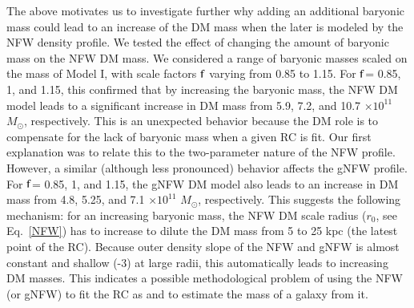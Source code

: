 \documentclass{aa}
\begin{document}
The above motivates us to investigate further why adding an additional baryonic mass could lead to an increase of the DM mass when the later is modeled by the NFW density profile. We tested the effect of changing the amount of baryonic mass on the NFW DM mass. We considered a range of baryonic masses scaled on the mass of Model I, with scale factors $\rm f$ varying from 0.85 to 1.15. For $\rm f$= 0.85, 1, and 1.15,  this confirmed that by increasing the baryonic mass, the NFW DM model leads to a significant increase in DM mass from  5.9, 7.2, and 10.7 $\times 10^{11}$ $M_{\odot}$, respectively. This is an unexpected behavior because the DM role is to compensate for the lack of baryonic mass when a given RC is fit. Our first explanation was to relate this to the two-parameter nature of the NFW profile. However, a similar (although less pronounced) behavior affects the gNFW profile. For $\rm f$= 0.85, 1, and 1.15, the gNFW DM model also leads to an increase in DM mass from  4.8, 5.25, and 7.1 $\times 10^{11}$ $M_{\odot}$, respectively. This suggests the following mechanism: for an increasing baryonic mass, the NFW DM scale radius ($r_0$, see Eq.~\ref{NFW}) has to  increase to dilute the DM mass from 5 to 25 kpc (the latest point of the RC). Because outer density slope of the NFW and gNFW is almost constant and shallow (-3) at large radii, this automatically leads to increasing DM masses. This indicates a possible methodological problem of using the NFW (or gNFW) to fit the RC as and to estimate the mass of a galaxy from it. 



\end{document}
